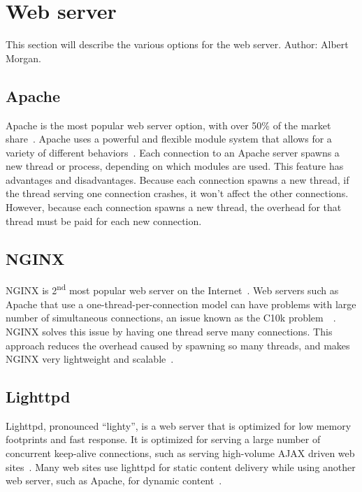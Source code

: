 \documentclass[10pt,draftclsnofoot,onecolumn]{IEEEtran}
\begin{document}
	\newpage

	\tableofcontents
	\newpage
	
	\pagestyle{headings}



	\section{Web server}
	This section will describe the various options for the web server. Author: Albert Morgan.

	\subsection{Apache}
	Apache is the most popular web server option, with over 50\% of the market share~\cite{apache-usage-statistics}.
	Apache uses a powerful and flexible module system that allows for a variety of different behaviors~\cite{apache-vs-nginx-practical-considerations}.
	Each connection to an Apache server spawns a new thread or process, depending on which modules are used.
	This feature has advantages and disadvantages.
	Because each connection spawns a new thread, if the thread serving one connection crashes, it won't affect the other connections.
	However, because each connection spawns a new thread, the overhead for that thread must be paid for each new connection.

	\subsection{NGINX}
	NGINX is 2\textsuperscript{nd} most popular web server on the Internet~\cite{nginx-usage-statistics}.
	Web servers such as Apache that use a one-thread-per-connection model can have problems with large number of simultaneous connections, an issue known as the C10k problem~\cite{apache-vs-nginx-practical-considerations}~\cite{c10k-problem}.
	NGINX solves this issue by having one thread serve many connections.
	This approach reduces the overhead caused by spawning so many threads, and makes NGINX very lightweight and scalable~\cite{nginx-vs-apache-our-view}.
	
	\subsection{Lighttpd}
	Lighttpd, pronounced ``lighty'', is a web server that is optimized for low memory footprints and fast response.
	It is optimized for serving a large number of concurrent keep-alive connections, such as serving high-volume AJAX driven web sites~\cite{lighttpd}. Many web sites use lighttpd for static content delivery while using another web server, such as Apache,
	for dynamic content~\cite{powered-by-lighttpd}.
\end{document}
